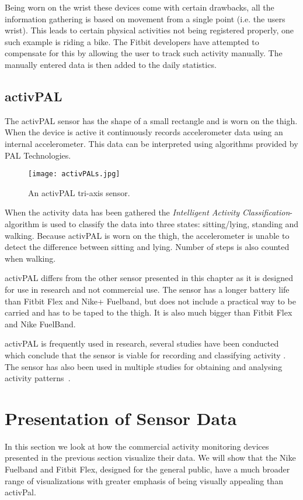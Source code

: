 Being worn on the wrist these devices come with certain drawbacks, all the information gathering is based on movement from a single point (i.e. the users wrist). This leads to certain physical activities not being registered properly, one such example is riding a bike. The Fitbit developers have attempted to compensate for this by allowing the user to track such activity manually. The manually entered data is then added to the daily statistics. 

\subsection{activPAL}
\label{sensorActivPal}
The activPAL sensor has the shape of a small rectangle and is worn on the thigh. When the device is active it continuously records accelerometer data using an internal accelerometer. This data can be interpreted using algorithms provided by PAL Technologies.

\begin{figure}[h!]
	\centering
		\texttt{[image: activPALs.jpg]}
		\caption[activPal sensor]{An activPAL tri-axis sensor.}
		\label{fig:activPal}
\end{figure}

When the activity data has been gathered the \emph{Intelligent Activity Classification}-algorithm is used to classify the data into three states: sitting/lying, standing and walking. Because activPAL is worn on the thigh, the accelerometer is unable to detect the difference between sitting and lying. Number of steps is also counted when walking.

activPAL differs from the other sensor presented in this chapter as it is designed for use in research and not commercial use. The sensor has a longer battery life than Fitbit Flex and Nike+ Fuelband, but does not include a practical way to be carried and has to be taped to the thigh. It is also much bigger than Fitbit Flex and Nike FuelBand. 

activPAL is frequently used in research, several studies have been conducted which conclude that the sensor is viable for recording and classifying activity \cite{grant2006, ryan2006, grant2008, tsavourelou}. The sensor has also been used in multiple studies for obtaining and analysing activity patterns~\cite{grant2010, lord, ryan2010}.

\section{Presentation of Sensor Data}
In this section we look at how the commercial activity monitoring devices presented in the previous section visualize their data. We will show that the Nike Fuelband and Fitbit Flex, designed for the general public, have a much broader range of visualizations with greater emphasis of being visually appealing than activPal.

